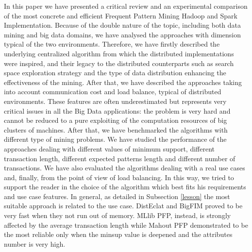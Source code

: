 In this paper we have presented a critical review and an experimental comparison of the most concrete and efficient Frequent Pattern Mining Hadoop and Spark Implementation. Because of the double nature of the topic, including both data mining and big data domains, we have analysed the approaches with dimension typical of the two environments. Therefore, we have firstly described the underlying centralized algorithm from which the distributed implementations were inspired, and their legacy to the distributed counterparts such as search space exploration strategy and the type of data distribution enhancing the effectiveness of the mining. After that, we have described the approaches taking into account communication cost and load balance, typical of distributed environments. These features are often underestimated but represents very critical issues in all the Big Data applications: the problem is very hard and cannot be reduced to a pure exploiting of the computation resources of big clusters of machines.
After that, we have benchmarked the algorithms with different type of mining problems. We have studied the performance of the approaches dealing with different values of minimum support, different transaction length, different expected patterns length and different number of transactions. We have also evaluated the algorithms dealing with a real use cases and, finally, from the point of view of load balancing.
In this way, we tried to support the reader in the choice of the algorithm which best fits his requirements and use case features.
In general, as detailed in Subsection \ref{lesson} the most suitable approach is related to the use case. DistEclat and BigFIM proved to be very fast when they not run out of memory. MLlib PFP, instead, is strongly affected by the average transaction length while Mahout PFP demonstrated to be the most reliable only when the minsup value is deepened and the attributes number is very high.

 
  
